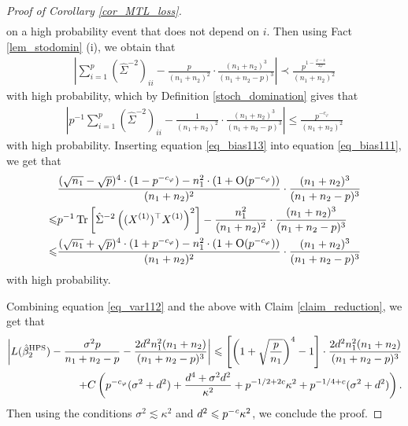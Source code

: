\begin{proof}[Proof of Corollary \ref{cor_MTL_loss}]
\begin{align*}
\end{align*}
on a high probability event that does not depend on $i$. Then using Fact \ref{lem_stodomin} (i), we obtain that 
\begin{align*} 
\left| \sum_{i=1}^p \left(\hat\Sigma^{-2}\right)_{ii} - \frac{p}{(n_1+n_2)^2}\cdot  \frac{(n_1+n_2)^3}{(n_1+n_2-p)^3}\right|\prec \frac{p^{1-\frac{\varphi-4}{2\varphi}}}{(n_1+n_2)^2}
\end{align*}
with high probability, which by Definition \ref{stoch_domination} gives that
\begin{align}\label{eq_bias113}
\left| p^{-1}\sum_{i=1}^p \left(\hat\Sigma^{-2}\right)_{ii} - \frac{1}{(n_1+n_2)^2}\cdot  \frac{(n_1+n_2)^3}{(n_1+n_2-p)^3}\right|\le \frac{p^{-c_\varphi}}{(n_1+n_2)^2}
\end{align}
with high probability. Inserting equation \eqref{eq_bias113} into equation \eqref{eq_bias111}, we get that
\begin{align*}
		& \frac{(\sqrt{n_1}-\sqrt{p})^4 \cdot (1- p^{-c_\varphi}) - n_1^2 \cdot (1+\operatorname{O}(p^{-c_\varphi}))}{(n_1+n_2)^2}\cdot   \frac{(n_1+n_2)^3}{(n_1+n_2-p)^3}\nonumber \\
		\leqslant &  {p}^{-1}\operatorname{Tr}\left[\hat\Sigma^{-2} \left((X^{(1)})^\top X^{(1)} \right)^2\right] - \frac{n_1^2}{(n_1+n_2)^2}\cdot  \frac{(n_1+n_2)^3}{(n_1+n_2-p)^3} \nonumber\\
		\leqslant &  \frac{(\sqrt{n_1}+\sqrt{p})^4 \cdot (1+ p^{-c_\varphi}) - n_1^2 \cdot (1+\operatorname{O}(p^{-c_\varphi}))}{(n_1+n_2)^2}\cdot   \frac{(n_1+n_2)^3}{(n_1+n_2-p)^3}
\end{align*}
with high probability. 

Combining equation \eqref{eq_var112} and the above with Claim \ref{claim_reduction}, we get that
\begin{align*}
	\left|L(\hat{\beta}_2^{\textup{HPS}})  - \frac{\sigma^2 p}{n_1+n_2-p} -  \frac{2d^2 n_1^2 (n_1+n_2)}{(n_1 + n_2 - p)^3}\right| \leqslant   \left[\left( 1+\sqrt{\frac{p}{n_1}}\right)^4-1\right] \cdot \frac{2d^2n_1^2 (n_1+n_2)}{(n_1 + n_2 - p)^3} \nonumber\\
+C\left( p^{-c_\varphi} (\sigma^2 + d^2)+ \frac{d^4 + \sigma^2 d^2}{\kappa^2}+p^{-1/2+2c}\kappa^2 +  p^{-1/4+c} (\sigma^2 +d^2) \right).
\end{align*}
Then using the conditions $\sigma^2 \lesssim  \kappa^2$ and $d^2 \leqslant p^{-{\mathit{c}}}{\kappa^2}$, we conclude the proof.
\end{proof}
